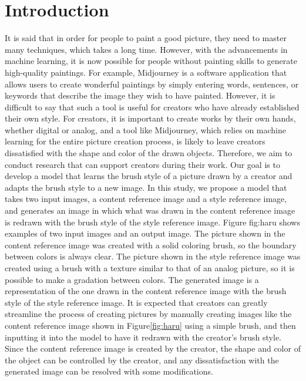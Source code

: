 \documentclass{mva_style}
\begin{document}
\section{Introduction}
It is said that in order for people to paint a good picture, they need 
to master many techniques, which takes a long time. However, with the 
advancements in machine learning, it is now possible for people without 
painting skills to generate high-quality paintings. 
For example, Midjourney\cite{Midjourney} is a software application that 
allows users to create wonderful paintings by simply entering words, 
sentences, or keywords that describe the image they wish to have painted. 
However, it is difficult to say that such a tool is useful for creators who 
have already established their own style. For creators, it is important to 
create works by their own hands, whether digital or analog, and a tool like 
Midjourney, which relies on machine learning for the entire picture creation 
process, is likely to leave creators dissatisfied with the shape and color 
of the drawn objects. Therefore, we aim to conduct research that can support 
creators during their work. Our goal is to develop a model that learns the 
brush style of a picture drawn by a creator and adapts the brush style to a 
new image. In this study, we propose a model that takes two input images, 
a content reference image and a style reference image, and generates an image 
in which what was drawn in the content reference image is redrawn with the 
brush style of the style reference image. 
Figure {fig:haru} shows examples of two input images and an output image.
The picture shown in the content reference image was created with a solid 
coloring brush, so the boundary between colors is always clear. The picture 
shown in the style reference image was created using a brush with a texture 
similar to that of an analog picture, so it is possible to make a gradation 
between colors. The generated image is a 
representation of the one drawn in the content reference image with the 
brush style of the style reference image.
It is expected that creators can greatly streamline the process of creating 
pictures by manually creating images like the content reference image shown 
in Figure\ref{fig:haru} using a simple brush, and then inputting it into the 
model to have it redrawn with the creator's brush style. Since the content 
reference image is created by the creator, the shape and color of the object 
can be controlled by the creator, and any dissatisfaction with the generated 
image can be resolved with some modifications.
\end{document}
